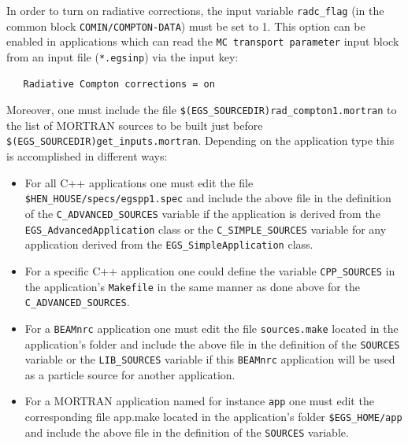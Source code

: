 In order to turn on radiative corrections, the input variable
\texttt{radc\_flag} (in the common block \texttt{COMIN/COMPTON-DATA}) must be set to 1.
This option can be enabled in applications which can read the \texttt{MC transport parameter}
input block from an input file (\texttt{*.egsinp}) via the input key:
\begin{verbatim}
   Radiative Compton corrections = on
\end{verbatim}
Moreover, one must include the file \texttt{\$(EGS\_SOURCEDIR)rad\_compton1.mortran} to the
list of MORTRAN sources to be built just before \texttt{\$(EGS\_SOURCEDIR)get\_inputs.mortran}.
Depending on the application type this is accomplished in different ways:

\begin{itemize}
 \item
  For all C++ applications one must edit the file \texttt{\$HEN\_HOUSE/specs/egspp1.spec}
  and include the above file in the definition of the \texttt{C\_ADVANCED\_SOURCES}
  variable if the application is derived from the \texttt{EGS\_AdvancedApplication} class or the
  \texttt{C\_SIMPLE\_SOURCES} variable for any application derived from the \texttt{EGS\_SimpleApplication} class.
 \item
  For a specific C++ application one could define the variable \texttt{CPP\_SOURCES} in the application's
  \texttt{Makefile} in the same manner as done above for the \texttt{C\_ADVANCED\_SOURCES}.
 \item
  For a \texttt{BEAMnrc} application one must edit the file \texttt{sources.make} located in the application's
  folder and include the above file in the definition of the \texttt{SOURCES} variable
  or the \texttt{LIB\_SOURCES} variable if this \texttt{BEAMnrc} application will be used as a particle source for
  another application.
 \item
  For a MORTRAN application named for instance \texttt{app} one must edit the corresponding file app.make located
  in the application's folder \texttt{\$EGS\_HOME/app} and include the above file
  in the definition of the \texttt{SOURCES} variable.
\end{itemize}


